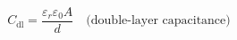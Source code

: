 \documentclass[preview]{standalone}
\begin{document}
\[C_\text{dl} = \frac{\varepsilon_r \varepsilon_0 A}{d} \quad \text{(double-layer capacitance)} \tag{2.1}\]
\end{document}
